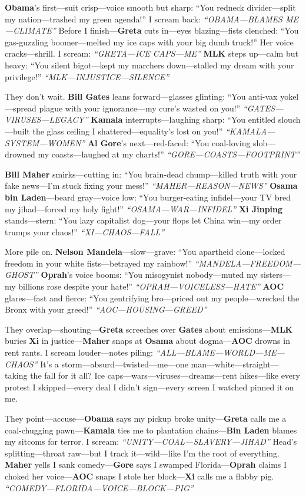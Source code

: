 \documentclass{article}
\begin{document}
\textbf{Obama}’s first—suit crisp—voice smooth but sharp: “You redneck divider—split my nation—trashed my green agenda!” I scream back: \textit{“OBAMA—BLAMES ME—CLIMATE”} Before I finish—\textbf{Greta} cuts in—eyes blazing—fists clenched: “You gas-guzzling boomer—melted my ice caps with your big dumb truck!” Her voice cracks—shrill. I scream: \textit{“GRETA—ICE CAPS—ME”} \textbf{MLK} steps up—calm but heavy: “You silent bigot—kept my marchers down—stalled my dream with your privilege!” \textit{“MLK—INJUSTICE—SILENCE”}

They don’t wait. \textbf{Bill Gates} leans forward—glasses glinting: “You anti-vax yokel—spread plague with your ignorance—my cure’s wasted on you!” \textit{“GATES—VIRUSES—LEGACY”} \textbf{Kamala} interrupts—laughing sharp: “You entitled slouch—built the glass ceiling I shattered—equality’s lost on you!” \textit{“KAMALA—SYSTEM—WOMEN”} \textbf{Al Gore}’s next—red-faced: “You coal-loving slob—drowned my coasts—laughed at my charts!” \textit{“GORE—COASTS—FOOTPRINT”}

\textbf{Bill Maher} smirks—cutting in: “You brain-dead chump—killed truth with your fake news—I’m stuck fixing your mess!” \textit{“MAHER—REASON—NEWS”} \textbf{Osama bin Laden}—beard gray—voice low: “You burger-eating infidel—your TV bred my jihad—forced my holy fight!” \textit{“OSAMA—WAR—INFIDEL”} \textbf{Xi Jinping} stands—stern: “You lazy capitalist dog—your flops let China win—my order trumps your chaos!” \textit{“XI—CHAOS—FALL”}

More pile on. \textbf{Nelson Mandela}—slow—grave: “You apartheid clone—locked freedom in your white fists—betrayed my rainbow!” \textit{“MANDELA—FREEDOM—GHOST”} \textbf{Oprah}’s voice booms: “You misogynist nobody—muted my sisters—my billions rose despite your hate!” \textit{“OPRAH—VOICELESS—HATE”} \textbf{AOC} glares—fast and fierce: “You gentrifying bro—priced out my people—wrecked the Bronx with your greed!” \textit{“AOC—HOUSING—GREED”}

They overlap—shouting—\textbf{Greta} screeches over \textbf{Gates} about emissions—\textbf{MLK} buries \textbf{Xi} in justice—\textbf{Maher} snaps at \textbf{Osama} about dogma—\textbf{AOC} drowns in rent rants. I scream louder—notes piling: \textit{“ALL—BLAME—WORLD—ME—CHAOS”} It’s a storm—absurd—twisted—me—one man—white—straight—taking the fall for it all? Ice caps—wars—viruses—dreams—rent hikes—like every protest I skipped—every deal I didn’t sign—every screen I watched pinned it on me.

They point—accuse—\textbf{Obama} says my pickup broke unity—\textbf{Greta} calls me a coal-chugging pawn—\textbf{Kamala} ties me to plantation chains—\textbf{Bin Laden} blames my sitcoms for terror. I scream: \textit{“UNITY—COAL—SLAVERY—JIHAD”} Head’s splitting—throat raw—but I track it—wild—like I’m the root of everything. \textbf{Maher} yells I sank comedy—\textbf{Gore} says I swamped Florida—\textbf{Oprah} claims I choked her voice—\textbf{AOC} snaps I stole her block—\textbf{Xi} calls me a flabby pig. \textit{“COMEDY—FLORIDA—VOICE—BLOCK—PIG”}
\end{document}
